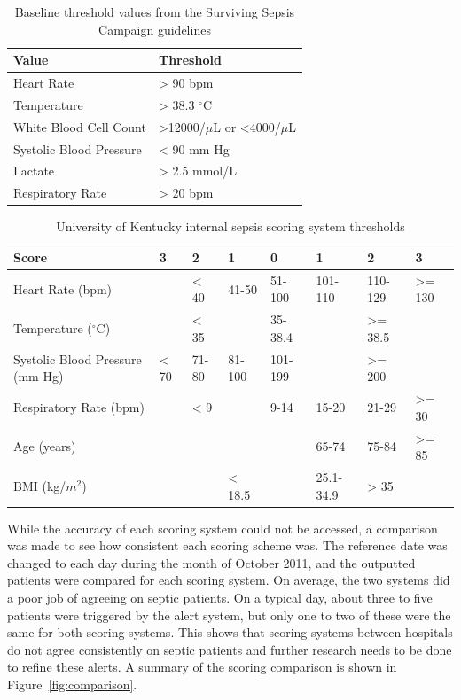 \documentclass{sig-alternate}
\begin{document}
\begin{table}
\renewcommand{\arraystretch}{1.5}
  \begin{tabular}{| l | l |}
\hline

{\bf Value} & {\bf Threshold}\\ \hline
Heart Rate & > 90 bpm\\ \hline
Temperature & > 38.3 $^\circ$C\\ \hline
White Blood Cell Count & >12000/$\mu$L  or <4000/$\mu$L\\ \hline
Systolic Blood Pressure & < 90 mm Hg\\ \hline
Lactate & > 2.5 mmol/L\\ \hline
Respiratory Rate & > 20 bpm\\ \hline

 \end{tabular}
	\caption{Baseline threshold values from the Surviving Sepsis Campaign guidelines}
  \label{tab:threshold_table}
\end{table}

\begin{table}
\renewcommand{\arraystretch}{1.5}
  \begin{tabular}{| l | l | l | l | l | l | l | l |}
\hline

{\bf Score} & {\bf 3} & {\bf 2} & {\bf 1} & {\bf 0} & {\bf 1} & {\bf 2} & {\bf 3}\\ \hline
Heart Rate (bpm) & & < 40 & 41-50 & 51-100 & 101-110 & 110-129 & >= 130\\ \hline
Temperature ($^\circ$C) & & < 35 & & 35-38.4 & & >= 38.5 &\\ \hline
Systolic Blood Pressure (mm Hg) & < 70 & 71-80 & 81-100 & 101-199 & & >= 200 & \\ \hline
Respiratory Rate (bpm) & & < 9 & & 9-14 & 15-20 & 21-29 & >= 30\\ \hline
Age (years) & & & & & 65-74 & 75-84 & >= 85\\ \hline
BMI (kg/$m^2$) & & & < 18.5 & & 25.1-34.9 & > 35 & \\ \hline

 \end{tabular}
	\caption{University of Kentucky internal sepsis scoring system thresholds}
  \label{tab:uk_table}
\end{table}

While the accuracy of each scoring system could not be accessed, a comparison was made to see how consistent each scoring scheme was.  The reference date was changed to each day during the month of October 2011, and the outputted patients were compared for each scoring system.  On average, the two systems did a poor job of agreeing on septic patients.  On a typical day, about three to five patients were triggered by the alert system, but only one to two of these were the same for both scoring systems.  This shows that scoring systems between hospitals do not agree consistently on septic patients and further research needs to be done to refine these alerts.  A summary of the scoring comparison is shown in Figure~\ref{fig:comparison}.
\end{document}
